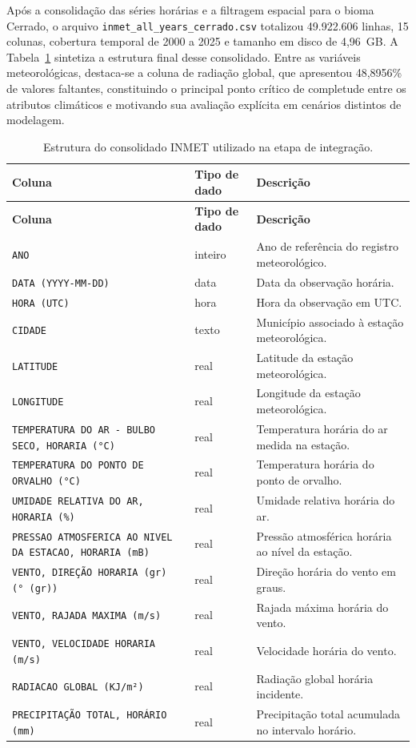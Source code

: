 Após a consolidação das séries horárias e a filtragem espacial para o bioma Cerrado, o arquivo \texttt{inmet\_all\_years\_cerrado.csv} totalizou 49.922.606 linhas, 15 colunas, cobertura temporal de 2000 a 2025 e tamanho em disco de 4,96~GB. A Tabela~\ref{tab:inmet-colunas} sintetiza a estrutura final desse consolidado. Entre as variáveis meteorológicas, destaca-se a coluna de radiação global, que apresentou 48,8956\% de valores faltantes, constituindo o principal ponto crítico de completude entre os atributos climáticos e motivando sua avaliação explícita em cenários distintos de modelagem.

\begin{longtable}{p{5.0cm}p{2.3cm}p{6.3cm}}
\caption{Estrutura do consolidado INMET utilizado na etapa de integração.}
\label{tab:inmet-colunas}\\
\hline
\textbf{Coluna} & \textbf{Tipo de dado} & \textbf{Descrição} \\
\hline
\endfirsthead

\hline
\textbf{Coluna} & \textbf{Tipo de dado} & \textbf{Descrição} \\
\hline
\endhead

\hline
\endfoot

\texttt{ANO} & inteiro & Ano de referência do registro meteorológico. \\
\texttt{DATA (YYYY-MM-DD)} & data & Data da observação horária. \\
\texttt{HORA (UTC)} & hora & Hora da observação em UTC. \\
\texttt{CIDADE} & texto & Município associado à estação meteorológica. \\
\texttt{LATITUDE} & real & Latitude da estação meteorológica. \\
\texttt{LONGITUDE} & real & Longitude da estação meteorológica. \\
\texttt{TEMPERATURA DO AR - BULBO SECO, HORARIA (°C)} & real & Temperatura horária do ar medida na estação. \\
\texttt{TEMPERATURA DO PONTO DE ORVALHO (°C)} & real & Temperatura horária do ponto de orvalho. \\
\texttt{UMIDADE RELATIVA DO AR, HORARIA (\%)} & real & Umidade relativa horária do ar. \\
\texttt{PRESSAO ATMOSFERICA AO NIVEL DA ESTACAO, HORARIA (mB)} & real & Pressão atmosférica horária ao nível da estação. \\
\texttt{VENTO, DIREÇÃO HORARIA (gr) (° (gr))} & real & Direção horária do vento em graus. \\
\texttt{VENTO, RAJADA MAXIMA (m/s)} & real & Rajada máxima horária do vento. \\
\texttt{VENTO, VELOCIDADE HORARIA (m/s)} & real & Velocidade horária do vento. \\
\texttt{RADIACAO GLOBAL (KJ/m²)} & real & Radiação global horária incidente. \\
\texttt{PRECIPITAÇÃO TOTAL, HORÁRIO (mm)} & real & Precipitação total acumulada no intervalo horário. \\
\end{longtable}

